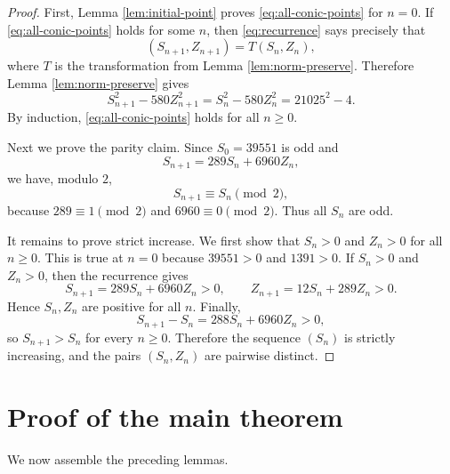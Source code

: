 \documentclass[11pt]{article}
\numberwithin{equation}{section}
\begin{document}
\begin{proof}
First, Lemma \ref{lem:initial-point} proves \eqref{eq:all-conic-points} for
$n=0$. If \eqref{eq:all-conic-points} holds for some $n$, then
\eqref{eq:recurrence} says precisely that
\begin{equation*}
        (S_{n+1},Z_{n+1})=T(S_n,Z_n),
\end{equation*}
where $T$ is the transformation from Lemma \ref{lem:norm-preserve}. Therefore
Lemma \ref{lem:norm-preserve} gives
\begin{equation*}
        S_{n+1}^2-580Z_{n+1}^2=S_n^2-580Z_n^2=21025^2-4.
\end{equation*}
By induction, \eqref{eq:all-conic-points} holds for all $n\geq 0$.

Next we prove the parity claim. Since $S_0=39551$ is odd and
\begin{equation*}
        S_{n+1}=289S_n+6960Z_n,
\end{equation*}
we have, modulo $2$,
\begin{equation*}
        S_{n+1}\equiv S_n \pmod 2,
\end{equation*}
because $289\equiv 1\pmod 2$ and $6960\equiv 0\pmod 2$. Thus all $S_n$ are
odd.

It remains to prove strict increase. We first show that $S_n>0$ and $Z_n>0$ for
all $n\geq 0$. This is true at $n=0$ because $39551>0$ and $1391>0$. If
$S_n>0$ and $Z_n>0$, then the recurrence gives
\begin{equation*}
        S_{n+1}=289S_n+6960Z_n>0,
        \qquad
        Z_{n+1}=12S_n+289Z_n>0.
\end{equation*}
Hence $S_n,Z_n$ are positive for all $n$. Finally,
\begin{equation*}
        S_{n+1}-S_n=288S_n+6960Z_n>0,
\end{equation*}
so $S_{n+1}>S_n$ for every $n\geq 0$. Therefore the sequence $(S_n)$ is
strictly increasing, and the pairs $(S_n,Z_n)$ are pairwise distinct.
\end{proof}

\section{Proof of the main theorem}

We now assemble the preceding lemmas.
\end{document}
